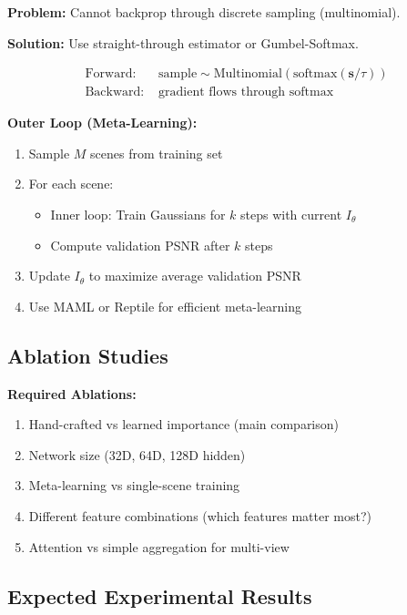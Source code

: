 \documentclass[11pt,letterpaper]{article}
\begin{document}
\textbf{Problem:} Cannot backprop through discrete sampling (multinomial).

\textbf{Solution:} Use straight-through estimator or Gumbel-Softmax.

\begin{align*}
\text{Forward: } &\text{sample} \sim \text{Multinomial}(\text{softmax}(\mathbf{s} / \tau)) \\
\text{Backward: } &\text{gradient flows through softmax}
\end{align*}

\textbf{Outer Loop (Meta-Learning):}
\begin{enumerate}[leftmargin=*]
    \item Sample $M$ scenes from training set
    \item For each scene:
    \begin{itemize}
        \item Inner loop: Train Gaussians for $k$ steps with current $I_\theta$
        \item Compute validation PSNR after $k$ steps
    \end{itemize}
    \item Update $I_\theta$ to maximize average validation PSNR
    \item Use MAML or Reptile for efficient meta-learning
\end{enumerate}

\subsection{Ablation Studies}

\textbf{Required Ablations:}
\begin{enumerate}[leftmargin=*]
    \item Hand-crafted vs learned importance (main comparison)
    \item Network size (32D, 64D, 128D hidden)
    \item Meta-learning vs single-scene training
    \item Different feature combinations (which features matter most?)
    \item Attention vs simple aggregation for multi-view
\end{enumerate}

\subsection{Expected Experimental Results}
\end{document}
